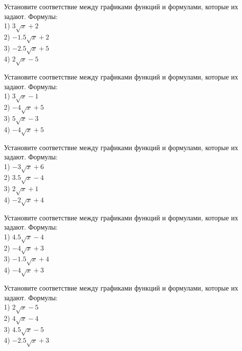 \documentclass[4apaper]{article}
\begin{document}
\begin{taskBN}{6}
Установите соответствие между графиками функций и формулами, которые их задают. Формулы: \\1) $3\sqrt{x}+2$\\2) $-1.5\sqrt{x}+2$\\3) $-2.5\sqrt{x}+5$\\4) $2\sqrt{x}-5$
\end{taskBN}

\begin{taskBN}{7}
Установите соответствие между графиками функций и формулами, которые их задают. Формулы: \\1) $3\sqrt{x}-1$\\2) $-4\sqrt{x}+5$\\3) $5\sqrt{x}-3$\\4) $-4\sqrt{x}+5$
\end{taskBN}

\begin{taskBN}{8}
Установите соответствие между графиками функций и формулами, которые их задают. Формулы: \\1) $-3\sqrt{x}+6$\\2) $3.5\sqrt{x}-4$\\3) $2\sqrt{x}+1$\\4) $-2\sqrt{x}+4$
\end{taskBN}

\begin{taskBN}{9}
Установите соответствие между графиками функций и формулами, которые их задают. Формулы: \\1) $4.5\sqrt{x}-4$\\2) $-4\sqrt{x}+3$\\3) $-1.5\sqrt{x}+4$\\4) $-4\sqrt{x}+3$
\end{taskBN}

\begin{taskBN}{10}
Установите соответствие между графиками функций и формулами, которые их задают. Формулы: \\1) $2\sqrt{x}-5$\\2) $4\sqrt{x}-4$\\3) $4.5\sqrt{x}-5$\\4) $-2.5\sqrt{x}+3$
\end{taskBN}
\end{document}
